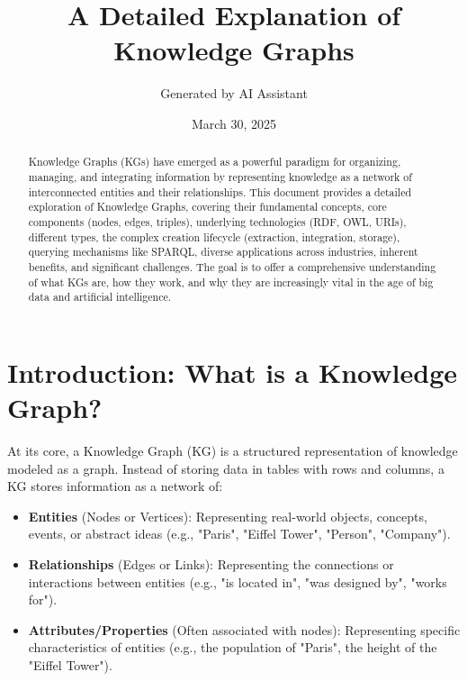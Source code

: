 \documentclass[11pt, a4paper]{article}
\title{\Huge A Detailed Explanation of Knowledge Graphs}
\author{Generated by AI Assistant}
\date{March 30, 2025} %
\begin{document}
\maketitle
\RaggedRight %

\begin{abstract}
\noindent Knowledge Graphs (KGs) have emerged as a powerful paradigm for organizing, managing, and integrating information by representing knowledge as a network of interconnected entities and their relationships. This document provides a detailed exploration of Knowledge Graphs, covering their fundamental concepts, core components (nodes, edges, triples), underlying technologies (RDF, OWL, URIs), different types, the complex creation lifecycle (extraction, integration, storage), querying mechanisms like SPARQL, diverse applications across industries, inherent benefits, and significant challenges. The goal is to offer a comprehensive understanding of what KGs are, how they work, and why they are increasingly vital in the age of big data and artificial intelligence.
\end{abstract}

\tableofcontents
\clearpage


\section{Introduction: What is a Knowledge Graph?}
\label{sec:introduction}

At its core, a Knowledge Graph (KG) is a structured representation of knowledge modeled as a graph. Instead of storing data in tables with rows and columns, a KG stores information as a network of:
\begin{itemize}
    \item \textbf{Entities} (Nodes or Vertices): Representing real-world objects, concepts, events, or abstract ideas (e.g., "Paris", "Eiffel Tower", "Person", "Company").
    \item \textbf{Relationships} (Edges or Links): Representing the connections or interactions between entities (e.g., "is located in", "was designed by", "works for").
    \item \textbf{Attributes/Properties} (Often associated with nodes): Representing specific characteristics of entities (e.g., the population of "Paris", the height of the "Eiffel Tower").
\end{itemize}
\end{document}
